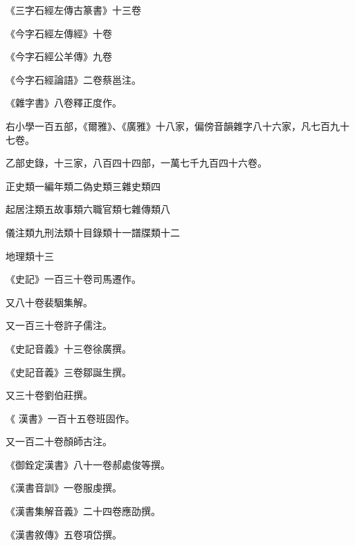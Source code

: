 \begin{pinyinscope}
 《三字石經左傳古篆書》十三卷



 《今字石經左傳經》十卷



 《今字石經公羊傳》九卷



 《今字石經論語》二卷蔡邕注。



 《雜字書》八卷釋正度作。



 右小學一百五部，《爾雅》、《廣雅》十八家，偏傍音韻雜字八十六家，凡七百九十七卷。



 乙部史錄，十三家，八百四十四部，一萬七千九百四十六卷。



 正史類一編年類二偽史類三雜史類四



 起居注類五故事類六職官類七雜傳類八



 儀注類九刑法類十目錄類十一譜牒類十二



 地理類十三



 《史記》一百三十卷司馬遷作。



 又八十卷裴駰集解。



 又一百三十卷許子儒注。



 《史記音義》十三卷徐廣撰。



 《史記音義》三卷鄒誕生撰。



 又三十卷劉伯莊撰。



 《
 漢書》一百十五卷班固作。



 又一百二十卷顏師古注。



 《御銓定漢書》八十一卷郝處俊等撰。



 《漢書音訓》一卷服虔撰。



 《漢書集解音義》二十四卷應劭撰。



 《漢書敘傳》五卷項岱撰。




\end{pinyinscope}
